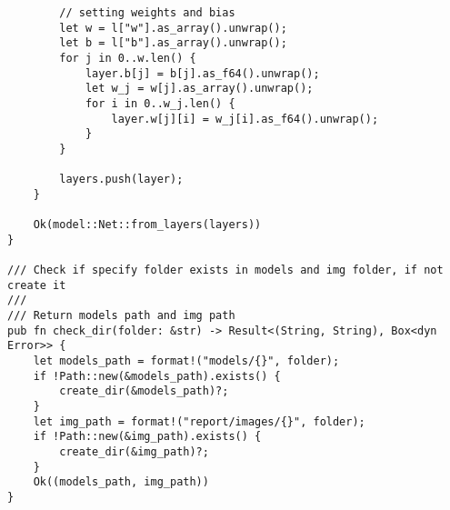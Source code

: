 \begin{verbatim}
        // setting weights and bias
        let w = l["w"].as_array().unwrap();
        let b = l["b"].as_array().unwrap();
        for j in 0..w.len() {
            layer.b[j] = b[j].as_f64().unwrap();
            let w_j = w[j].as_array().unwrap();
            for i in 0..w_j.len() {
                layer.w[j][i] = w_j[i].as_f64().unwrap();
            }
        }

        layers.push(layer);
    }

    Ok(model::Net::from_layers(layers))
}

/// Check if specify folder exists in models and img folder, if not create it
///
/// Return models path and img path
pub fn check_dir(folder: &str) -> Result<(String, String), Box<dyn Error>> {
    let models_path = format!("models/{}", folder);
    if !Path::new(&models_path).exists() {
        create_dir(&models_path)?;
    }
    let img_path = format!("report/images/{}", folder);
    if !Path::new(&img_path).exists() {
        create_dir(&img_path)?;
    }
    Ok((models_path, img_path))
}
\end{verbatim}